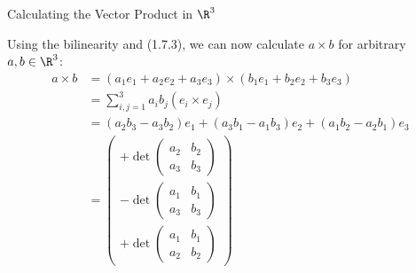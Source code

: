 \documentclass[smaller,hyperref={CJKbookmarks=true}]{beamer}
\begin{document}
\begin{frame}[t,shrink]{Calculating the Vector Product in $\R^3$}
\begin{spacing}{1.1}
Using the bilinearity and (1.7.3), we can now calculate $a\times b$ for arbitrary $a,b\in\R^3$:
\setcounter{equation}{3}
\begin{equation}\label{1.7.4}
  \begin{split}
     a\times b &=(a_1e_1+a_2e_2+a_3e_3)\times (b_1e_1+b_2e_2+b_3e_3) \\
       &=\sum_{i,j=1}^{3}a_ib_j(e_i\times e_j)  \\
       &=(a_2b_3-a_3b_2)e_1+(a_3b_1-a_1b_3)e_2+(a_1b_2-a_2b_1)e_3  \\
       &=\begin{pmatrix}
           +\det\begin{pmatrix}
                  a_2 & b_2 \\
                  a_3 & b_3
                \end{pmatrix} \\
           -\det\begin{pmatrix}
                  a_1 & b_1 \\
                  a_3 & b_3
                \end{pmatrix} \\
           +\det\begin{pmatrix}
                  a_1 & b_1 \\
                  a_2 & b_2
                \end{pmatrix}
         \end{pmatrix}
  \end{split}
\end{equation}
\end{spacing}
\end{frame}
\end{document}
